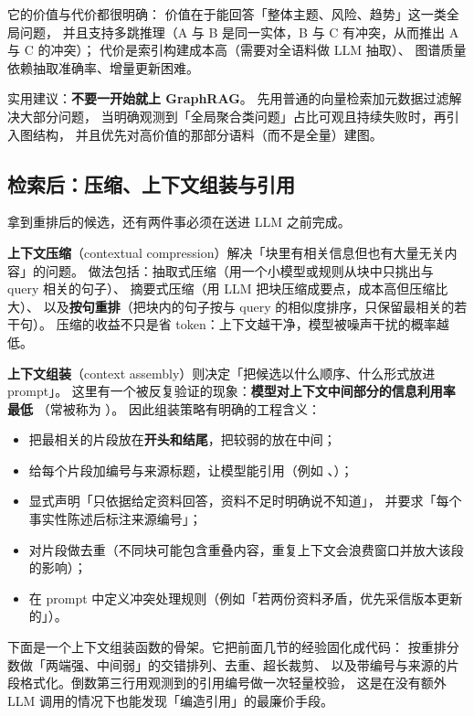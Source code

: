 它的价值与代价都很明确：
价值在于能回答「整体主题、风险、趋势」这一类全局问题，
并且支持多跳推理（A 与 B 是同一实体，B 与 C 有冲突，从而推出 A 与 C 的冲突）；
代价是索引构建成本高（需要对全语料做 LLM 抽取）、
图谱质量依赖抽取准确率、增量更新困难。

实用建议：\textbf{不要一开始就上 GraphRAG}。
先用普通的向量检索加元数据过滤解决大部分问题，
当明确观测到「全局聚合类问题」占比可观且持续失败时，再引入图结构，
并且优先对高价值的那部分语料（而不是全量）建图。

\subsection{检索后：压缩、上下文组装与引用}

拿到重排后的候选，还有两件事必须在送进 LLM 之前完成。

\textbf{上下文压缩}（contextual compression）解决「块里有相关信息但也有大量无关内容」的问题。
做法包括：抽取式压缩（用一个小模型或规则从块中只挑出与 query 相关的句子）、
摘要式压缩（用 LLM 把块压缩成要点，成本高但压缩比大）、
以及\textbf{按句重排}（把块内的句子按与 query 的相似度排序，只保留最相关的若干句）。
压缩的收益不只是省 token：上下文越干净，模型被噪声干扰的概率越低。

\textbf{上下文组装}（context assembly）则决定「把候选以什么顺序、什么形式放进 prompt」。
这里有一个被反复验证的现象：\textbf{模型对上下文中间部分的信息利用率最低}
（常被称为 ）。
因此组装策略有明确的工程含义：

\begin{itemize}
  \item 把最相关的片段放在\textbf{开头和结尾}，把较弱的放在中间；
  \item 给每个片段加编号与来源标题，让模型能引用（例如 \code{[1]}、\code{[2]}）；
  \item 显式声明「只依据给定资料回答，资料不足时明确说不知道」，
        并要求「每个事实性陈述后标注来源编号」；
  \item 对片段做去重（不同块可能包含重叠内容，重复上下文会浪费窗口并放大该段的影响）；
  \item 在 prompt 中定义冲突处理规则（例如「若两份资料矛盾，优先采信版本更新的」）。
\end{itemize}

下面是一个上下文组装函数的骨架。它把前面几节的经验固化成代码：
按重排分数做「两端强、中间弱」的交错排列、去重、超长裁剪、
以及带编号与来源的片段格式化。倒数第三行用观测到的引用编号做一次轻量校验，
这是在没有额外 LLM 调用的情况下也能发现「编造引用」的最廉价手段。

